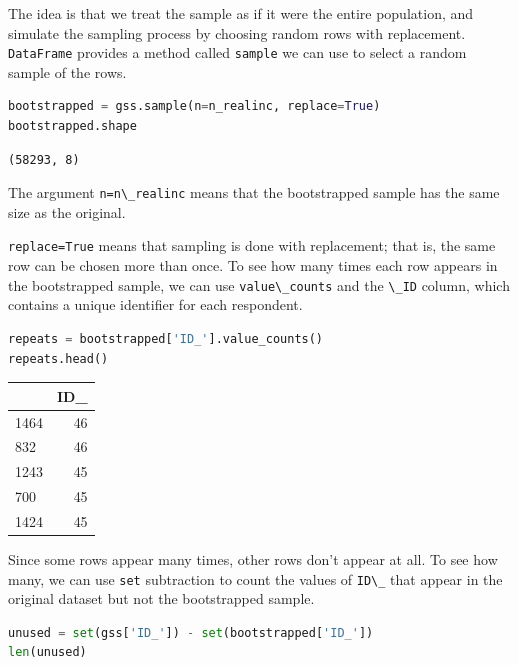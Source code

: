 The idea is that we treat the sample as if it were the entire
population, and simulate the sampling process by choosing random rows
with replacement. \passthrough{\lstinline!DataFrame!} provides a method
called \passthrough{\lstinline!sample!} we can use to select a random
sample of the rows.

\begin{lstlisting}[language=Python,style=source]
bootstrapped = gss.sample(n=n_realinc, replace=True)
bootstrapped.shape
\end{lstlisting}

\begin{lstlisting}[style=output]
(58293, 8)
\end{lstlisting}

The argument \passthrough{\lstinline!n=n\_realinc!} means that the
bootstrapped sample has the same size as the original.

\passthrough{\lstinline!replace=True!} means that sampling is done with
replacement; that is, the same row can be chosen more than once. To see
how many times each row appears in the bootstrapped sample, we can use
\passthrough{\lstinline!value\_counts!} and the
\passthrough{\lstinline!\_ID!} column, which contains a unique
identifier for each respondent.

\begin{lstlisting}[language=Python,style=source]
repeats = bootstrapped['ID_'].value_counts()
repeats.head()
\end{lstlisting}

\begin{tabular}{lr}
\toprule
{} &  ID\_ \\
\midrule
1464 &   46 \\
832  &   46 \\
1243 &   45 \\
700  &   45 \\
1424 &   45 \\
\bottomrule
\end{tabular}

Since some rows appear many times, other rows don't appear at all. To
see how many, we can use \passthrough{\lstinline!set!} subtraction to
count the values of \passthrough{\lstinline!ID\_!} that appear in the
original dataset but not the bootstrapped sample.

\begin{lstlisting}[language=Python,style=source]
unused = set(gss['ID_']) - set(bootstrapped['ID_'])
len(unused)
\end{lstlisting}

